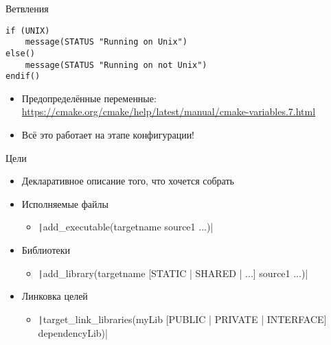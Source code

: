 \documentclass{../../slides-style}
\begin{document}
    \begin{frame}[fragile]{Ветвления}
        \begin{verbatim}
if (UNIX)
    message(STATUS "Running on Unix")
else()
    message(STATUS "Running on not Unix")
endif()
        \end{verbatim}
        \begin{itemize}
            \item Предопределённые переменные: \url{https://cmake.org/cmake/help/latest/manual/cmake-variables.7.html}
            \item Всё это работает на этапе конфигурации!
        \end{itemize}
    \end{frame}

    \begin{frame}{Цели}
        \begin{itemize}
            \item Декларативное описание того, что хочется собрать
            \item Исполняемые файлы
            \begin{itemize}
                \item \texttt|add_executable(targetname source1 ...)|
            \end{itemize}
            \item Библиотеки
            \begin{itemize}
                \item \texttt|add_library(targetname [STATIC | SHARED | ...] source1 ...)|
            \end{itemize}
            \item Линковка целей
            \begin{itemize}
                \item \texttt|target_link_libraries(myLib [PUBLIC | PRIVATE | INTERFACE] dependencyLib)|
            \end{itemize}
        \end{itemize}
    \end{frame}
\end{document}
